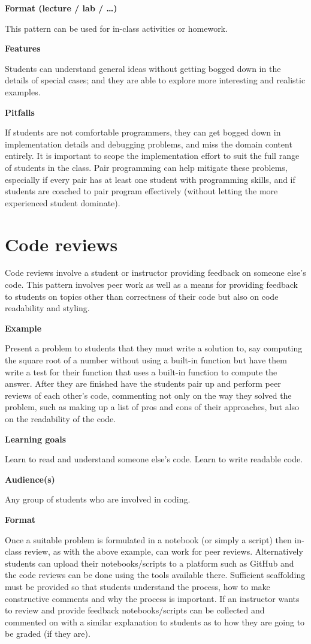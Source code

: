 \documentclass[]{book}
\begin{document}
\textbf{Format (lecture / lab / \ldots{})}

This pattern can be used for in-class activities or homework.

\textbf{Features}

Students can understand general ideas without getting bogged down in the
details of special cases; and they are able to explore more interesting
and realistic examples.

\textbf{Pitfalls}

If students are not comfortable programmers, they can get bogged down in
implementation details and debugging problems, and miss the domain
content entirely. It is important to scope the implementation effort to
suit the full range of students in the class. Pair programming can help
mitigate these problems, especially if every pair has at least one
student with programming skills, and if students are coached to pair
program effectively (without letting the more experienced student
dominate).

\section{Code reviews}\label{code-reviews}

Code reviews involve a student or instructor providing feedback on
someone else's code. This pattern involves peer work as well as a means
for providing feedback to students on topics other than correctness of
their code but also on code readability and styling.

\textbf{Example}

Present a problem to students that they must write a solution to, say
computing the square root of a number without using a built-in function
but have them write a test for their function that uses a built-in
function to compute the answer. After they are finished have the
students pair up and perform peer reviews of each other's code,
commenting not only on the way they solved the problem, such as making
up a list of pros and cons of their approaches, but also on the
readability of the code.

\textbf{Learning goals}

Learn to read and understand someone else's code. Learn to write
readable code.

\textbf{Audience(s)}

Any group of students who are involved in coding.

\textbf{Format}

Once a suitable problem is formulated in a notebook (or simply a script)
then in-class review, as with the above example, can work for peer
reviews. Alternatively students can upload their notebooks/scripts to a
platform such as GitHub and the code reviews can be done using the tools
available there. Sufficient scaffolding must be provided so that
students understand the process, how to make constructive comments and
why the process is important. If an instructor wants to review and
provide feedback notebooks/scripts can be collected and commented on
with a similar explanation to students as to how they are going to be
graded (if they are).
\end{document}
